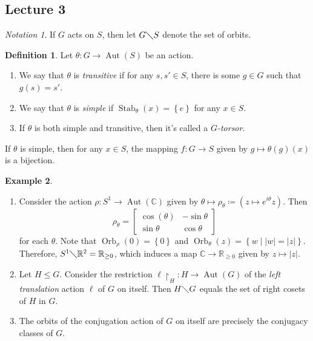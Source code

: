 \documentclass[10pt,letterpaper,cm]{nupset}
\theoremstyle{definition}
\newtheorem{definition}{Definition}[subsection]
\newtheorem{exmp}[definition]{Example}
\theoremstyle{theorem}
\theoremstyle{remark}
\newtheorem*{notation}{Notation}
\newcommand{\C}{\mathbb C}
\newcommand{\R}{\mathbb R}
\newcommand{\1}{\mathbf{1}}
\newcommand{\0}{\vec 0}
\DeclareMathOperator{\aut}{Aut}
\DeclareMathOperator{\stab}{Stab}
\DeclareMathOperator{\orb}{Orb}
\begin{document}
\subsection{Lecture 3}

\begin{notation}
If $G$ acts on $S$, then let $G \diagdown S$ denote the set of orbits.
\end{notation}

\begin{definition} Let $\theta: G \to \aut(S)$ be an action.
\begin{enumerate}
\item We say that  $\theta$ is \textit{transitive} if for any $s, s' \in S$, there is some $g \in G$ such that $g(s) = s'$. 
\item We say that $\theta$ is \textit{simple} if $\stab_\theta(x) = \left\{e\right\}$ for any $x \in S$.
\item If $\theta$ is both simple and transitive, then it's called a \textit{$G$-torsor}.
\end{enumerate}
\end{definition}

If $\theta$ is simple, then for any $x \in S$, the mapping $f: G \to S$ given by $g\mapsto \theta(g)(x)$ is a bijection.

\begin{exmp} $ $
\begin{enumerate}
\item Consider the action $\rho: S^1 \to \aut(\C)$ given by $\theta \mapsto \rho_{\theta}\coloneqq \left(z \mapsto e^{i\theta}z\right).$ Then $$\rho_{\theta} = \begin{bmatrix} \cos(\theta) & {-\sin{\theta}} \\ \sin{\theta} & \cos{\theta} \end{bmatrix}$$ for each $\theta$.  Note that $\orb_{\rho}(0) = \left\{0\right\}$ and $\orb_{\theta}(z) = \left\{w \mid \left\lvert{w}\right\rvert = \left\lvert{z}\right\rvert\right\}$. Therefore,  $S^1 \diagdown \R^2 = \R_{\geq 0}$, which induces a map $\C \to \R_{\geq 0}$ given by $z \mapsto \left\lvert{z}\right\rvert$.
\item Let $H \leq G$. Consider the restriction $\ell\restriction_H : H \to \aut(G)$ of the \textit{left translation} action $\ell$ of $G$ on itself. Then $H \diagdown G$ equals the set of right cosets of $H$ in $G$. 
\item The orbits of the conjugation action of $G$ on itself are precisely  the conjugacy classes of $G$. 
\end{enumerate}
\end{exmp}
\end{document}

